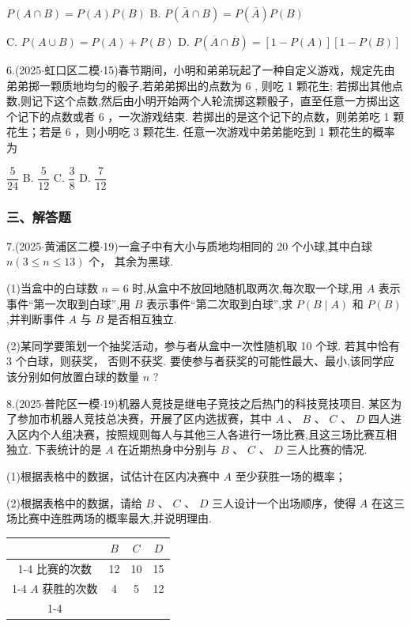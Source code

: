 \xx{}{}{}{}$P\left( {A \cap  B}\right)  = P\left( A\right) P\left( B\right)$ B. $P\left( {\overline{A} \cap  B}\right)  = P\left( \overline{A}\right) P\left( B\right)$

C. $P\left( {A \cup  B}\right)  = P\left( A\right)  + P\left( B\right)$ D. $P\left( {\overline{A} \cap  \overline{B}}\right)  = \left\lbrack  {1 - P\left( A\right) }\right\rbrack  \left\lbrack  {1 - P\left( B\right) }\right\rbrack$

6.(2025$\cdot$虹口区二模$\cdot$15)春节期间，小明和弟弟玩起了一种自定义游戏，规定先由弟弟掷一颗质地均匀的骰子,若弟弟掷出的点数为 6 , 则吃 1 颗花生; 若掷出其他点数,则记下这个点数,然后由小明开始两个人轮流掷这颗骰子，直至任意一方掷出这个记下的点数或者 6 ，一次游戏结束. 若掷出的是这个记下的点数，则弟弟吃 1 颗花生；若是 6 ，则小明吃 3 颗花生. 任意一次游戏中弟弟能吃到 1 颗花生的概率为 \dotfill{(\kh{})}

\xx{}{}{}{}$\dfrac{5}{24}$ B. $\dfrac{5}{12}$ C. $\dfrac{3}{8}$ D. $\dfrac{7}{12}$

\subsubsection*{三、解答题}

7.(2025$\cdot$黄浦区二模$\cdot$19)一盒子中有大小与质地均相同的 20 个小球,其中白球 $n\left( {3 \leq  n \leq  {13}}\right)$ 个， 其余为黑球.

(1)当盒中的白球数 $n = 6$ 时,从盒中不放回地随机取两次,每次取一个球,用 $A$ 表示事件“第一次取到白球”,用 $B$ 表示事件“第二次取到白球”,求 $P\left( {B \mid  A}\right)$ 和 $P\left( B\right)$ ,并判断事件 $A$ 与 $B$ 是否相互独立.

(2)某同学要策划一个抽奖活动，参与者从盒中一次性随机取 10 个球. 若其中恰有 3 个白球，则获奖， 否则不获奖. 要使参与者获奖的可能性最大、最小,该同学应该分别如何放置白球的数量 $n$ ?

8.(2025$\cdot$普陀区一模$\cdot$19)机器人竞技是继电子竞技之后热门的科技竞技项目. 某区为了参加市机器人竞技总决赛，开展了区内选拔赛，其中 $A$ 、 $B$ 、 $C$ 、 $D$ 四人进入区内个人组决赛，按照规则每人与其他三人各进行一场比赛,且这三场比赛互相独立. 下表统计的是 $A$ 在近期热身中分别与 $B$ 、 $C$ 、 $D$ 三人比赛的情况.

(1)根据表格中的数据，试估计在区内决赛中 $A$ 至少获胜一场的概率；

(2)根据表格中的数据，请给 $B$ 、 $C$ 、 $D$ 三人设计一个出场顺序，使得 $A$ 在这三场比赛中连胜两场的概率最大,并说明理由.

\begin{center}

\begin{tabular}{|c|c|c|c|}
\hline
\phantom{X} & $B$ & $C$ & $D$ \\
\cline{1-4}
比赛的次数 & 12 & 10 & 15 \\
\cline{1-4}
$A$ 获胜的次数 & 4 & 5 & 12 \\
\cline{1-4}
\hline
\end{tabular}
\end{center}


